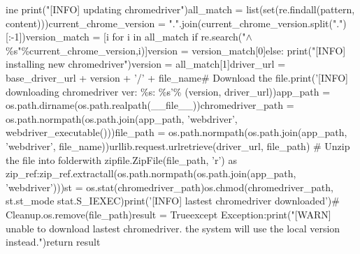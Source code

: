 \documentclass[10pt]{article} %
\begin{document}
\begin{spacing}{1.5}
ine                print("[INFO] updating chromedriver")\newline                all\_match = list(set(re.findall(pattern, content)))\newline                current\_chrome\_version = ".".join(current\_chrome\_version.split(".")[:-1])\newline                version\_match = [i for i in all\_match if re.search("$\mathrm{\wedge}$\%s"\%current\_chrome\_version,i)]\newline                version = version\_match[0]\newline            else:                print("[INFO] installing new chromedriver")\newline                version = all\_match[1]\newline            driver\_url = base\_driver\_url + version + '/' + file\_name\newline                \# Download the file.\newline            print('[INFO] downloading chromedriver ver: \%s: \%s'\% (version, driver\_url))\newline            app\_path = os.path.dirname(os.path.realpath(\_\_file\_\_))\newline            chromedriver\_path = os.path.normpath(os.path.join(app\_path, 'webdriver', webdriver\_executable()))\newline            file\_path = os.path.normpath(os.path.join(app\_path, 'webdriver', file\_name))\newline            urllib.request.urlretrieve(driver\_url, file\_path) \newline               \# Unzip the file into folder\newline            with zipfile.ZipFile(file\_path, 'r') as zip\_ref:\newline                zip\_ref.extractall(os.path.normpath(os.path.join(app\_path, 'webdriver')))\newline            st = os.stat(chromedriver\_path)\newline            os.chmod(chromedriver\_path, st.st\_mode {\textbar} stat.S\_IEXEC)\newline            print('[INFO] lastest chromedriver downloaded')\newline            \# Cleanup.\newline            os.remove(file\_path)\newline            result = True\newline    except Exception:\newline        print("[WARN] unable to download lastest chromedriver. the system will use the local version instead.")\newline        return result\newline

\end{spacing}
\newpage
 
\end{document}
